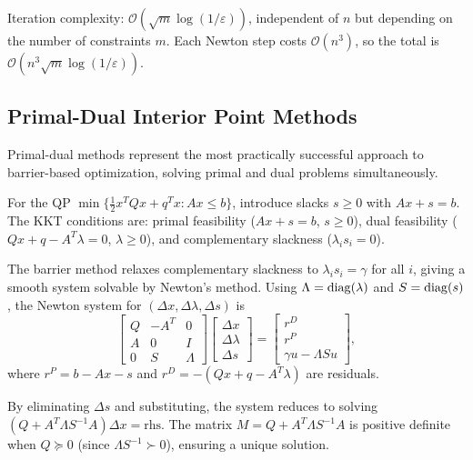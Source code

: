 Iteration complexity: $\mathcal{O}(\sqrt{m}\log(1/\varepsilon))$, independent of $n$ but depending on the number of constraints $m$.
Each Newton step costs $\mathcal{O}(n^3)$, so the total is $\mathcal{O}(n^3 \sqrt{m}\log(1/\varepsilon))$.


\subsection{Primal-Dual Interior Point Methods}\label{sec:ipm}

Primal-dual methods represent the most practically successful approach to barrier-based optimization, solving primal and dual problems simultaneously.

For the QP $\min\{\frac{1}{2} x^T Q x + q^T x : Ax \leq b\}$, introduce slacks $s \geq 0$ with $Ax + s = b$.
The KKT conditions are: primal feasibility ($Ax + s = b$, $s \geq 0$), dual feasibility ($Qx + q - A^T\lambda = 0$, $\lambda \geq 0$), and complementary slackness ($\lambda_i s_i = 0$).

The barrier method relaxes complementary slackness to $\lambda_i s_i = \gamma$ for all $i$, giving a smooth system solvable by Newton's method.
Using $\Lambda = \operatorname{diag}(\lambda)$ and $S = \operatorname{diag}(s)$, the Newton system for $(\Delta x, \Delta\lambda, \Delta s)$ is
\begin{equation}\label{eq:ipm-newton}
	\begin{bmatrix} Q & -A^T & 0 \\ A & 0 & I \\ 0 & S & \Lambda \end{bmatrix}
	\begin{bmatrix} \Delta x \\ \Delta\lambda \\ \Delta s \end{bmatrix}
	= \begin{bmatrix} r^D \\ r^P \\ \gamma u - \Lambda S u \end{bmatrix},
\end{equation}
where $r^P = b - Ax - s$ and $r^D = -(Qx + q - A^T\lambda)$ are residuals.

By eliminating $\Delta s$ and substituting, the system reduces to solving $(Q + A^T\Lambda S^{-1}A)\Delta x = \text{rhs}$.
The matrix $M = Q + A^T\Lambda S^{-1}A$ is positive definite when $Q \succeq 0$ (since $\Lambda S^{-1} \succ 0$), ensuring a unique solution.

